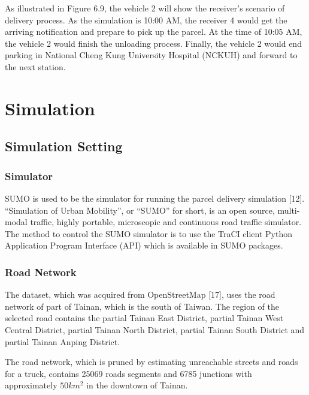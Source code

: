 \documentclass[12pt]{ksthesis}
\begin{document}
\begin{thesis}
{As illustrated in Figure 6.9, the vehicle 2 will show the receiver’s scenario of delivery process. As the simulation is 10:00 AM, the receiver 4 would get the arriving notification and prepare to pick up the parcel. At the time of 10:05 AM, the vehicle 2 would finish the unloading process. Finally, the vehicle 2 would end parking in National Cheng Kung University Hospital (NCKUH) and forward to the next station.








\chapter{Simulation}\label{Chap:Simulation}

\section{Simulation Setting}

\subsection{Simulator}
SUMO is used to be the simulator for running the parcel delivery simulation [12]. “Simulation of Urban Mobility”, or “SUMO” for short, is an open source, multi-modal traffic, highly portable, microscopic and continuous road traffic simulator. The method to control the SUMO simulator is to use the TraCI client Python Application Program Interface (API) which is available in SUMO packages.

\subsection{Road Network}

The dataset, which was acquired from OpenStreetMap [17], uses the road network of part of Tainan, which is the south of Taiwan. The region of the selected road contains the partial Tainan East District, partial Tainan West Central District, partial Tainan North District, partial Tainan South District and partial Tainan Anping District.

The road network, which is pruned by estimating unreachable streets and roads for a truck, contains 25069 roads segments and 6785 junctions with approximately $50km^{2}$ in the downtown of Tainan.

}
\end{thesis}
\end{document}
